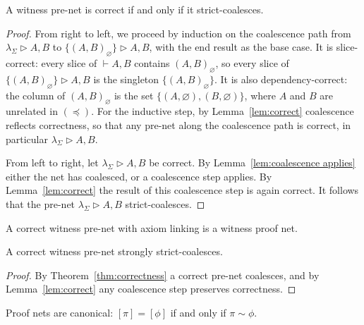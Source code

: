 \documentclass[UKenglish]{lipics-v2016}
\theoremstyle{plain}
\newcommand\+{+}
\renewcommand\*{\times}
\newcommand\dep{\preccurlyeq}
\newcommand\seq[2]{{\vdash}#1,#2}
\newcommand\net[3]{#1\triangleright #2,#3}
\newcommand\link[3][\sigma]{(#2,#3)_{#1}}
\begin{document}
\begin{theorem}
\label{thm:correctness}
A witness pre-net is correct if and only if it strict-coalesces. 
\end{theorem}

\begin{proof}
From right to left, we proceed by induction on the coalescence path from $\net{\lambda_\Sigma}AB$ to $\net{\{\link[\varnothing]AB\}}AB$, with the end result as the base case. It is slice-correct: every slice of $\seq AB$ contains $\link[\varnothing]AB$, so every slice of $\net{\{\link[\varnothing]AB\}}AB$ is the singleton $\{\link[\varnothing]AB\}$. It is also dependency-correct: the column of $\link[\varnothing]AB$ is the set $\{(A,\varnothing),(B,\varnothing)\}$, where $A$ and $B$ are unrelated in $(\dep)$. For the inductive step, by Lemma~\ref{lem:correct} coalescence reflects correctness, so that any pre-net along the coalescence path is correct, in particular $\net{\lambda_\Sigma}AB$.

From left to right, let $\net{\lambda_\Sigma}AB$ be correct. By Lemma~\ref{lem:coalescence applies} either the net has coalesced, or a coalescence step applies. By Lemma~\ref{lem:correct} the result of this coalescence step is again correct. It follows that the pre-net $\net{\lambda_\Sigma}AB$ strict-coalesces.
\end{proof}


\begin{corollary}
A correct witness pre-net with axiom linking is a witness proof net.
\end{corollary}


\begin{corollary}
\label{cor:strong coalescence}
A correct witness pre-net strongly strict-coalesces.
\end{corollary}

\begin{proof}
By Theorem~\ref{thm:correctness} a correct pre-net coalesces, and by Lemma~\ref{lem:correct} any coalescence step preserves correctness.
\end{proof}


\begin{theorem}
Proof nets are canonical: $[\pi]=[\phi]$ if and only if $\pi\sim\phi$.
\end{theorem}
\end{document}
